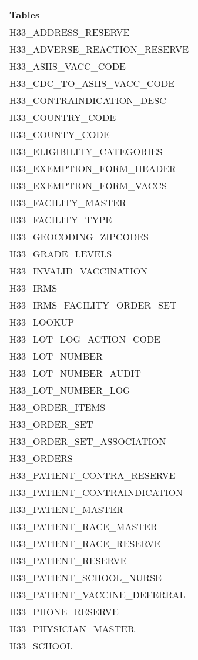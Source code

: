 \documentclass[
  letterpaper,
  DIV=11,
  numbers=noendperiod]{scrreprt}
\begin{document}
\begin{longtable}{l}
\toprule
Tables \\ 
\midrule
H33\_ADDRESS\_RESERVE \\ 
H33\_ADVERSE\_REACTION\_RESERVE \\ 
H33\_ASIIS\_VACC\_CODE \\ 
H33\_CDC\_TO\_ASIIS\_VACC\_CODE \\ 
H33\_CONTRAINDICATION\_DESC \\ 
H33\_COUNTRY\_CODE \\ 
H33\_COUNTY\_CODE \\ 
H33\_ELIGIBILITY\_CATEGORIES \\ 
H33\_EXEMPTION\_FORM\_HEADER \\ 
H33\_EXEMPTION\_FORM\_VACCS \\ 
H33\_FACILITY\_MASTER \\ 
H33\_FACILITY\_TYPE \\ 
H33\_GEOCODING\_ZIPCODES \\ 
H33\_GRADE\_LEVELS \\ 
H33\_INVALID\_VACCINATION \\ 
H33\_IRMS \\ 
H33\_IRMS\_FACILITY\_ORDER\_SET \\ 
H33\_LOOKUP \\ 
H33\_LOT\_LOG\_ACTION\_CODE \\ 
H33\_LOT\_NUMBER \\ 
H33\_LOT\_NUMBER\_AUDIT \\ 
H33\_LOT\_NUMBER\_LOG \\ 
H33\_ORDER\_ITEMS \\ 
H33\_ORDER\_SET \\ 
H33\_ORDER\_SET\_ASSOCIATION \\ 
H33\_ORDERS \\ 
H33\_PATIENT\_CONTRA\_RESERVE \\ 
H33\_PATIENT\_CONTRAINDICATION \\ 
H33\_PATIENT\_MASTER \\ 
H33\_PATIENT\_RACE\_MASTER \\ 
H33\_PATIENT\_RACE\_RESERVE \\ 
H33\_PATIENT\_RESERVE \\ 
H33\_PATIENT\_SCHOOL\_NURSE \\ 
H33\_PATIENT\_VACCINE\_DEFERRAL \\ 
H33\_PHONE\_RESERVE \\ 
H33\_PHYSICIAN\_MASTER \\ 
H33\_SCHOOL \\ 

\end{longtable}
\end{document}
